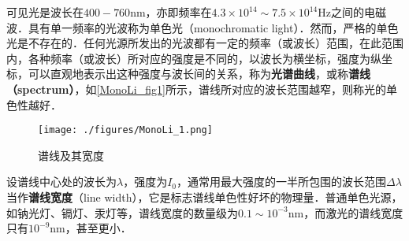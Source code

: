 
可见光是波长在$400-760\mathrm{nm}$，亦即频率在$4.3 \times 10^{14} \sim 7.5 \times 10^{14} \mathrm{Hz}$之间的电磁波．具有单一频率的光波称为单色光（monochromatic light）．然而，严格的单色光是不存在的．任何光源所发出的光波都有一定的频率（或波长）范围，在此范围内，各种频率（或波长）所对应的强度是不同的，以波长为横坐标，强度为纵坐标，可以直观地表示出这种强度与波长间的关系，称为\textbf{光谱曲线}，或称\textbf{谱线（spectrum）}，如\autoref{MonoLi_fig1}所示，谱线所对应的波长范围越窄，则称光的单色性越好．
\begin{figure}[ht]
\centering
\texttt{[image: ./figures/MonoLi\_1.png]}
\caption{谱线及其宽度} \label{MonoLi_fig1}
\end{figure}

设谱线中心处的波长为$\lambda$，强度为$I_0$，通常用最大强度的一半所包围的波长范围$\Delta\lambda$当作\textbf{谱线宽度}（line width），它是标志谱线单色性好坏的物理量．普通单色光源，如钠光灯、镉灯、汞灯等，谱线宽度的数量级为$0.1 \sim 10^{-3} \mathrm{nm}$，而激光的谱线宽度只有$10^{-9}\mathrm{nm}$，甚至更小．
